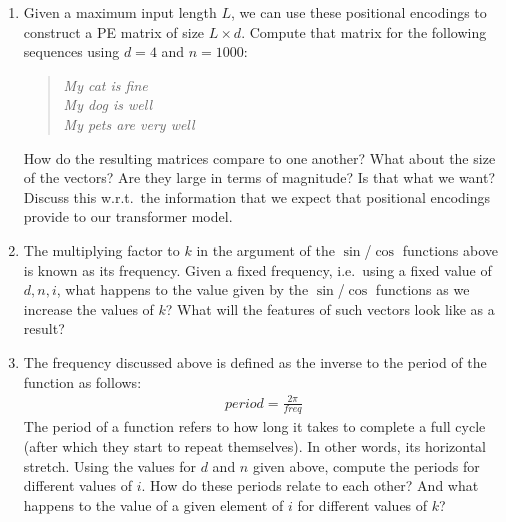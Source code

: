 \documentclass[11pt,a4paper]{article}
\begin{document}
\begin{enumerate}[label=(\alph*)]
          \begin{enumerate}[label=(\roman*)]
              \item Given a maximum input length $L$, we can use these positional
                    encodings to construct a PE matrix of size $L\times d$.
                    Compute that matrix for the following sequences using $d=4$
                    and $n=1000$:
                    \begin{quote}
                        \emph{My cat is fine} \\
                        \emph{My dog is well} \\
                        \emph{My pets are very well}
                    \end{quote}
                    How do the resulting matrices compare to one another?
                    What about the size of the vectors? Are they large in terms
                    of magnitude? Is that what we want?
                    Discuss this w.r.t.\ the information that we expect that
                    positional encodings provide to our transformer model.
              \item The multiplying factor to $k$ in the argument of the
                    $\sin$/$\cos$ functions above is known as its frequency.
                    Given a fixed frequency, i.e.\ using a fixed value of
                    $d, n, i$, what happens to the value given by the
                    $\sin$/$\cos$ functions as we increase the values of $k$?
                    What will the features of such vectors look like as a
                    result?
              \item The frequency discussed above is defined as the inverse to
                    the period of the function as follows:
                    \begin{align*}
                        period = \frac{2\pi}{freq}
                    \end{align*}
                    The period of a function refers to how long it takes to
                    complete a full cycle (after which they start to repeat
                    themselves).
                    In other words, its horizontal stretch.
                    Using the values for $d$ and $n$ given above, compute the
                    periods for different values of $i$.
                    How do these periods relate to each other?
                    And what happens to the value of a given element of $i$ for
                    different values of $k$?
          \end{enumerate}
\end{enumerate}
\end{document}
